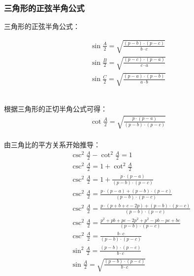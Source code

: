 \documentclass[UTF8]{ctexart}
\begin{document}
\subsubsection{三角形的正弦半角公式}
    三角形的正弦半角公式：
    \begin{large}
        \begin{align*}
            \sin{\frac{A}{2}}=\sqrt{\frac{(p-b)\cdot(p-c)}{b\cdot c}}\\[3mm]
            \sin{\frac{B}{2}}=\sqrt{\frac{(p-c)\cdot(p-a)}{c\cdot a}}\\[3mm]
            \sin{\frac{C}{2}}=\sqrt{\frac{(p-a)\cdot(p-b)}{a\cdot b}}
        \end{align*}
    \end{large}\\
    根据三角形的正切半角公式可得：
    \setcounter{equation}{0}
    \begin{align}
        \cot{\frac{A}{2}}=\sqrt{\frac{p\cdot(p-a)}{(p-b)\cdot(p-c)}}
    \end{align}\\
    由三角比的平方关系开始推导：\vspace{5pt}
    \begin{align}
        &\csc^2{\frac{A}{2}}-\cot^2{\frac{A}{2}}=1\\[3mm]
        &\csc^2{\frac{A}{2}}=1+\cot^2{\frac{A}{2}}\\[3mm]
        &\csc^2{\frac{A}{2}}=1+\frac{p\cdot(p-a)}{(p-b)\cdot(p-c)}\\[3mm]
        &\csc^2{\frac{A}{2}}=\frac{p\cdot(p-a)+(p-b)\cdot(p-c)}{(p-b)\cdot(p-c)}\\[3mm]
        &\csc^2{\frac{A}{2}}=\frac{p\cdot(p+b+c-2p)+(p-b)\cdot(p-c)}{(p-b)\cdot(p-c)}\\[3mm]
        &\csc^2{\frac{A}{2}}=\frac{p^2+pb+pc-2p^2+p^2-pb-pc+bc}{(p-b)\cdot(p-c)}\\[3mm]
        &\csc^2{\frac{A}{2}}=\frac{b\cdot c}{(p-b)\cdot(p-c)}\\[3mm]
        &\sin^2{\frac{A}{2}}=\frac{(p-b)\cdot(p-c)}{b\cdot c}\\[3mm]
        &\sin{\frac{A}{2}}=\sqrt{\frac{(p-b)\cdot(p-c)}{b\cdot c}}
    \end{align}

\newpage
\end{document}
